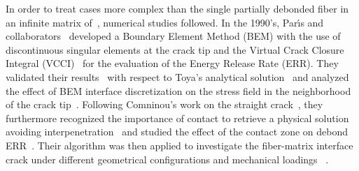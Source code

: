 \documentclass[review]{elsarticle}
\begin{document}
In order to treat cases more complex than the single partially debonded fiber in an infinite matrix of~\cite{England1966,Perlman1967,Toya1974}, numerical studies followed. In the 1990's, Par{\'{\i}}s and collaborators~\cite{Paris1996} developed a Boundary Element Method (BEM) with the use of discontinuous singular elements at the crack tip and the Virtual Crack Closure Integral (VCCI)~\cite{Irwin1958} for the evaluation of the Energy Release Rate (ERR). They validated their results~\cite{Paris1996} with respect to Toya's analytical solution~\cite{Toya1974} and analyzed the effect of BEM interface discretization on the stress field in the neighborhood of the crack tip~\cite{DelCano1997}. Following Comninou's work on the straight crack~\cite{Comninou1977}, they furthermore recognized the importance of contact to retrieve a physical solution avoiding interpenetration~\cite{Paris1996} and studied the effect of the contact zone on debond ERR~\cite{Varna1997a}. Their algorithm was then applied to investigate the fiber-matrix interface crack under different geometrical configurations and mechanical loadings ~\cite{Paris2007,Correa2007,Correa2011,Correa2013,Correa2014,Sandino2016,Sandino2018}.\\
\end{document}
